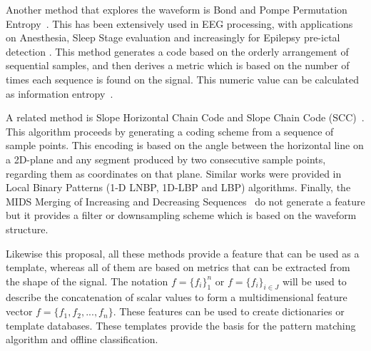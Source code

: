 Another method that explores the waveform is Bond and Pompe Permutation Entropy~\cite{Bandt2002}.  This has been extensively used in EEG processing, with applications on Anesthesia, Sleep Stage evaluation and increasingly for Epilepsy pre-ictal detection .  This method generates a code based on the orderly arrangement of sequential samples, and then derives a metric which is based on the number of times each sequence is found on the signal.  This numeric value can be calculated as information entropy~\cite{Nicolaou2010}.

A related method is Slope Horizontal Chain Code and Slope Chain Code (SCC)~\cite{Alvarado-Gonzalez2016}. This algorithm proceeds by generating a coding scheme from a sequence of sample points. This encoding is based on the angle between the horizontal line on a 2D-plane and any segment produced by two consecutive sample points, regarding them as coordinates on that plane.  Similar works were provided in Local Binary Patterns  (1-D LNBP, 1D-LBP and LBP)\cite{Jaiswal2017} algorithms.  Finally, the  MIDS Merging of Increasing and Decreasing Sequences~\cite{Zhang2013} do not generate a feature but it provides a filter or downsampling scheme which is based on the waveform structure.

%

Likewise this proposal, all these methods provide a feature that can be used as a template, whereas all of them are based on metrics that can be extracted from the shape of the signal.  The notation $f=\{f_i\}_{1}^{n} $ or $f=\{f_i\}_{i \in J}^{} $  will be used to describe the concatenation of scalar values to form a multidimensional feature vector $f=\{f_1,f_2,...,f_n\}$. These features can be used to create dictionaries or template databases.  These templates provide the basis for the pattern matching algorithm and offline classification. 

